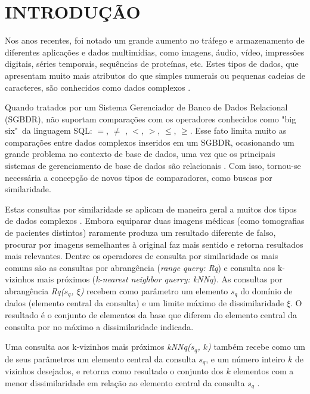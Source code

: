 

\chapter{INTRODUÇÃO}
\label{chap:introducao}
Nos anos recentes, foi notado um grande aumento no tráfego e armazenamento de diferentes aplicações e dados multimídias, como imagens, áudio, vídeo, impressões digitais, séries temporais,
sequências de proteínas, etc. Estes tipos de dados, que apresentam muito mais atributos do que simples numerais ou pequenas cadeias de caracteres, são conhecidos como dados complexos \cite{Zighed2008}.\par
Quando tratados por um Sistema Gerenciador de Banco de Dados Relacional (SGBDR), não suportam comparações com os operadores conhecidos como "big six"\ da linguagem SQL: $=$, $\neq$ , $<$, $>$, $\leq$, $\geq$.
Esse fato limita muito as comparações entre dados complexos inseridos em um SGBDR, ocasionando um grande problema no contexto de base de dados, uma vez que os principais sistemas de gerenciamento
de base de dados são relacionais \cite{DBE2017}. Com isso, tornou-se necessária a concepção de novos tipos de comparadores, como buscas por similaridade.\par 

Estas consultas por similaridade se aplicam de maneira geral a muitos dos tipos de dados complexos \cite{Barioni2009}. Embora equiparar duas imagens médicas (como tomografias de pacientes distintos) 
raramente produza um resultado diferente de falso, procurar por imagens semelhantes à original faz mais sentido e retorna resultados mais relevantes. Dentre os operadores de consulta por similaridade
os mais comuns são as consultas por abrangência (\textit{range query: Rq}) e consulta aos k-vizinhos mais próximos (\textit{k-nearest neighbor querry: kNNq}). As consultas por abrangência \textit{Rq($s_q$, $\xi$)}
recebem como parâmetro um elemento $s_q$ do domínio de dados (elemento central da consulta) e um limite máximo de dissimilaridade $\xi$. O resultado é o conjunto de elementos da base que diferem do elemento
central da consulta por no máximo a dissimilaridade indicada.\par

Uma consulta aos k-vizinhos mais próximos \textit{kNNq($s_q$, $k$)} também recebe como um de seus parâmetros um elemento central da consulta $s_q$, e um número inteiro $k$ de vizinhos desejados, e retorna
como resultado o conjunto dos $k$ elementos com a menor dissimilaridade em relação ao elemento central da consulta $s_q$ \cite{POLA2010}. 

